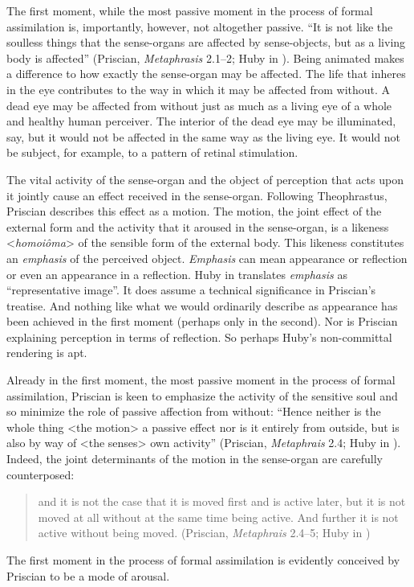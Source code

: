 \documentclass[12pt]{article}
\begin{document}
The first moment, while the most passive moment in the process of formal assimilation is, importantly, however, not altogether passive. ``It is not like the soulless things that the sense-organs are affected by sense-objects, but as a living body is affected'' (Priscian, \emph{Metaphrasis} 2.1--2; Huby in \citealt[9--10]{Sorabji:1997ly}). Being animated makes a difference to how exactly the sense-organ may be affected. The life that inheres in the eye contributes to the way in which it may be affected from without. A dead eye may be affected from without just as much as a living eye of a whole and healthy human perceiver. The interior of the dead eye may be illuminated, say, but it would not be affected in the same way as the living eye. It would not be subject, for example, to a pattern of retinal stimulation. 

The vital activity of the sense-organ and the object of perception that acts upon it jointly cause an effect received in the sense-organ. Following Theophrastus, Priscian describes this effect as a motion. The motion, the joint effect of the external form and the activity that it aroused in the sense-organ, is a likeness <\emph{homoiôma}> of the sensible form of the external body. This likeness constitutes an \emph{emphasis} of the perceived object. \emph{Emphasis} can mean appearance or reflection or even an appearance in a reflection. Huby in \citet[51 n.25]{Sorabji:1997ly} translates \emph{emphasis} as ``representative image''. It does assume a technical significance in Priscian's treatise. And nothing like what we would ordinarily describe as appearance has been achieved in the first moment (perhaps only in the second). Nor is Priscian explaining perception in terms of reflection. So perhaps Huby's non-committal rendering is apt.

Already in the first moment, the most passive moment in the process of formal assimilation, Priscian is keen to emphasize the activity of the sensitive soul and so minimize the role of passive affection from without: ``Hence neither is the whole thing <the motion> a passive effect nor is it entirely from outside, but is also by way of <the senses> own activity'' (Priscian, \emph{Metaphrais} 2.4; Huby in \citealt[10]{Sorabji:1997ly}). Indeed, the joint determinants of the motion in the sense-organ are carefully counterposed: 
\begin{quote}
	and it is not the case that it is moved first and is active later, but it is not moved at all without at the same time being active. And further it is not active without being moved. (Priscian, \emph{Metaphrais} 2.4--5; Huby in \citealt[10]{Sorabji:1997ly})
\end{quote}
The first moment in the process of formal assimilation is evidently conceived by Priscian to be a mode of arousal.
\end{document}

